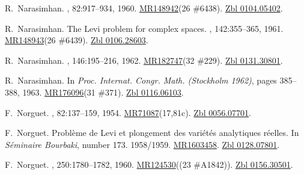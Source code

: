 \documentclass[11pt,a4paper, final, twoside]{article}
\numberwithin{equation}{section}
\begin{document}
\begin{appendices}
\begin{thebibliography}{100}
R.~Narasimhan.
, 82:917--934, 1960.
\newblock \href{http://www.ams.org/mathscinet-getitem?mr=148942}{MR148942}(26
  \#6438). \href{http://zbmath.org/?q=an:0104.05402}{Zbl 0104.05402}.

R.~Narasimhan.
\newblock The {L}evi problem for complex spaces.
, 142:355--365, 1961.
\newblock \href{http://www.ams.org/mathscinet-getitem?mr=148943}{MR148943}(26
  \#6439). \href{http://zbmath.org/?q=an:0106.28603}{Zbl 0106.28603}.

R.~Narasimhan.
, 146:195--216, 1962.
\newblock \href{http://www.ams.org/mathscinet-getitem?mr=182747}{MR182747}(32
  \#229). \href{http://zbmath.org/?q=an:0131.30801}{Zbl 0131.30801}.

R.~Narasimhan.
\newblock In {\em {Proc. Internat. Congr. Math. (Stockholm 1962)}}, pages
  385--388, 1963.
\newblock \href{http://www.ams.org/mathscinet-getitem?mr=176096}{MR176096}(31
  \#371). \href{http://zbmath.org/?q=an:0116.06103}{Zbl 0116.06103}.

F.~Norguet.
,
  82:137--159, 1954.
\newblock
  \href{http://www.ams.org/mathscinet-getitem?mr=71087}{MR71087}(17,81c).
  \href{http://zbmath.org/?q=an:0056.07701}{Zbl 0056.07701}.

F.~Norguet.
\newblock Probl\`eme de {L}evi et plongement des vari\'et\'es analytiques
  r\'eelles.
\newblock In {\em S\'eminaire {B}ourbaki}, number 173. 1958/1959.
\newblock \href{http://www.ams.org/mathscinet-getitem?mr=1603458}{MR1603458}.
  \href{http://zbmath.org/?q=an:0128.07801}{Zbl 0128.07801}.

F.~Norguet.
, 250:1780--1782, 1960.
\newblock \href{http://www.ams.org/mathscinet-getitem?mr=124530}{MR124530}((23
  \#A1842)). \href{http://zbmath.org/?q=an:0156.30501}{Zbl 0156.30501}.


\end{thebibliography}
\end{appendices}
\end{document}
